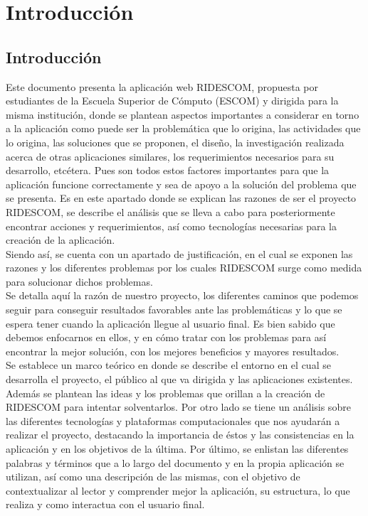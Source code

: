 \chapter{Introducción}
	\section{Introducci\'on}
	
	\noindent Este documento presenta la aplicación web RIDESCOM, propuesta por estudiantes de la Escuela Superior de Cómputo (ESCOM) y dirigida para la misma institución, donde se plantean aspectos importantes a considerar en torno a la aplicación como puede ser la problemática que lo origina, las actividades que lo origina, las soluciones que se proponen, el diseño, la investigación realizada acerca de otras aplicaciones similares, los requerimientos necesarios para su desarrollo, etcétera. Pues son todos estos factores importantes para que la aplicación funcione correctamente y sea de apoyo a la solución del problema que se presenta. Es en este apartado donde se explican las razones de ser el proyecto RIDESCOM, se describe el análisis que se lleva a cabo para posteriormente encontrar acciones y requerimientos, así como tecnologías necesarias para la creación de la aplicación. \\
	Siendo así, se cuenta con un apartado de justificación, en el cual se exponen las razones y los diferentes problemas por los cuales RIDESCOM surge como medida para solucionar dichos problemas.\\
	Se detalla aquí la razón de nuestro proyecto, los diferentes caminos que podemos seguir para conseguir resultados favorables ante las problemáticas y lo que se espera tener cuando la aplicación llegue al usuario final. Es bien sabido que debemos enfocarnos en ellos, y en cómo tratar con los problemas para así encontrar la mejor solución, con los mejores beneficios y mayores resultados.\\
	Se establece un marco teórico en donde se describe el entorno en el cual se desarrolla el proyecto, el público al que va dirigida y las aplicaciones existentes.\\
	Además se plantean las ideas y los problemas que orillan a la creación de RIDESCOM para intentar solventarlos. Por otro lado se tiene un análisis sobre las diferentes tecnologías y plataformas computacionales que nos ayudarán a realizar el proyecto, destacando la importancia de éstos y las consistencias en la aplicación y en los objetivos de la última. Por último, se enlistan las diferentes palabras y términos que a lo largo del documento y en la propia aplicación se utilizan, así como una descripción de las mismas, con el objetivo de contextualizar al lector y comprender mejor la aplicación, su estructura, lo que  realiza y como interactua con el usuario final.\\
